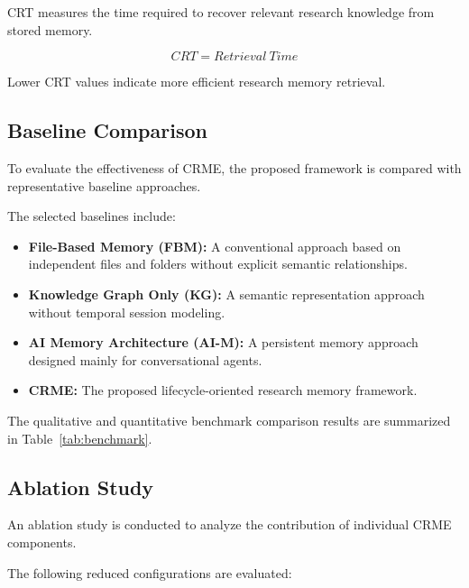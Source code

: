 CRT measures the time required to recover relevant research knowledge from stored memory.

\[
CRT = Retrieval\ Time
\]

Lower CRT values indicate more efficient research memory retrieval.

\subsection{Baseline Comparison}

To evaluate the effectiveness of CRME, the proposed framework is compared with representative baseline approaches.

The selected baselines include:

\begin{itemize}

\item \textbf{File-Based Memory (FBM):}
A conventional approach based on independent files and folders without explicit semantic relationships.

\item \textbf{Knowledge Graph Only (KG):}
A semantic representation approach without temporal session modeling.

\item \textbf{AI Memory Architecture (AI-M):}
A persistent memory approach designed mainly for conversational agents.

\item \textbf{CRME:}
The proposed lifecycle-oriented research memory framework.

\end{itemize}


The qualitative and quantitative benchmark comparison results are summarized in
Table~\ref{tab:benchmark}.





\subsection{Ablation Study}

An ablation study is conducted to analyze the contribution of individual CRME components.

The following reduced configurations are evaluated:


